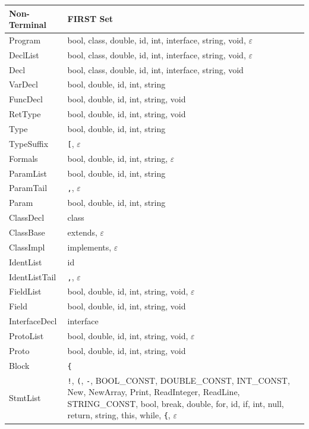 \documentclass[12pt,a4paper]{article}
\begin{document}
\begin{longtable}{lp{10cm}}
\toprule
\textbf{Non-Terminal} & \textbf{FIRST Set} \\
\midrule
\endhead
\bottomrule
\endfoot
Program        & bool, class, double, id, int, interface, string, void, $\varepsilon$ \\
DeclList       & bool, class, double, id, int, interface, string, void, $\varepsilon$ \\
Decl           & bool, class, double, id, int, interface, string, void \\
VarDecl        & bool, double, id, int, string \\
FuncDecl       & bool, double, id, int, string, void \\
RetType        & bool, double, id, int, string, void \\
Type           & bool, double, id, int, string \\
TypeSuffix     & \texttt{[}, $\varepsilon$ \\
Formals        & bool, double, id, int, string, $\varepsilon$ \\
ParamList      & bool, double, id, int, string \\
ParamTail      & \texttt{,}, $\varepsilon$ \\
Param          & bool, double, id, int, string \\
ClassDecl      & class \\
ClassBase      & extends, $\varepsilon$ \\
ClassImpl      & implements, $\varepsilon$ \\
IdentList      & id \\
IdentListTail  & \texttt{,}, $\varepsilon$ \\
FieldList      & bool, double, id, int, string, void, $\varepsilon$ \\
Field          & bool, double, id, int, string, void \\
InterfaceDecl  & interface \\
ProtoList      & bool, double, id, int, string, void, $\varepsilon$ \\
Proto          & bool, double, id, int, string, void \\
Block          & \texttt{\{} \\
StmtList       & \texttt{!}, \texttt{(}, \texttt{-}, BOOL\_CONST, DOUBLE\_CONST, INT\_CONST, New, NewArray, Print, ReadInteger, ReadLine, STRING\_CONST, bool, break, double, for, id, if, int, null, return, string, this, while, \texttt{\{}, $\varepsilon$ \\

\end{longtable}
\end{document}
